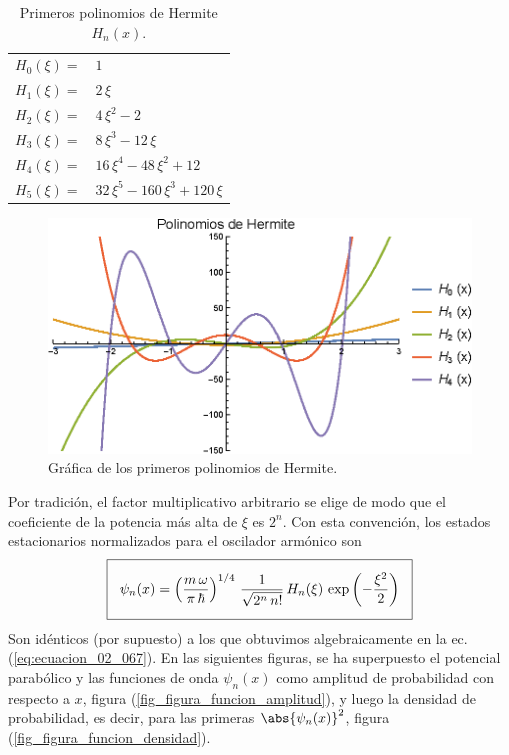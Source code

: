 \begin{center}
\begin{table}[H]
\large
\centering
\begin{tabular}{l l}
$H_{0}(\xi) =$ & $1$ \\
$H_{1}(\xi) =$ & $2 \, \xi$ \\
$H_{2}(\xi) =$ & $4 \, \xi^{2} - 2 $ \\
$H_{3}(\xi) =$ & $8 \, \xi^{3} - 12 \, \xi$ \\
$H_{4}(\xi) =$ & $16 \, \xi^{4} - 48 \, \xi^{2} + 12 $ \\
$H_{5}(\xi) =$ & $32 \, \xi^{5} - 160 \, \xi^{3} + 120 \, \xi$
\end{tabular}
\caption{Primeros polinomios de Hermite $H_{n}(x)$.}
\label{tabla_001}
\end{table}
\begin{figure}[H]
    \centering
    \includegraphics[scale=1]{Imagenes/Plot_Hermite_01.eps}
    \caption{Gráfica de los primeros polinomios de Hermite.}
    \label{figura_003}
\end{figure}
\end{center}
Por tradición, el factor multiplicativo arbitrario se elige de modo que el coeficiente de la potencia más alta de $\xi$ es $2^{n}$. Con esta convención, los estados estacionarios normalizados para el oscilador armónico son
\begin{align}
\setlength{\fboxsep}{3\fboxsep}\boxed{
\psi_{n} (x) = \left( \dfrac{m \, \omega}{\pi \, \hbar} \right)^{1/4} \, \dfrac{1}{\sqrt{2^{n} \, n!}} \, H_{n} (\xi) \, \exp \left( - \dfrac{\xi^{2}}{2} \right)}
\label{eq:ecuacion_02_069}
\end{align}
Son idénticos (por supuesto) a los que obtuvimos algebraicamente en la ec. (\ref{eq:ecuacion_02_067}).
\newpage
En las siguientes figuras, se ha superpuesto el potencial parabólico y las funciones de onda $\psi_{n} (x)$ como amplitud de probabilidad con respecto a $x$, figura (\ref{fig_figura_funcion_amplitud}), y luego la densidad de probabilidad, es decir, para las primeras $\abs{\psi_{n} (x)}^{2}$, figura (\ref{fig_figura_funcion_densidad}).

